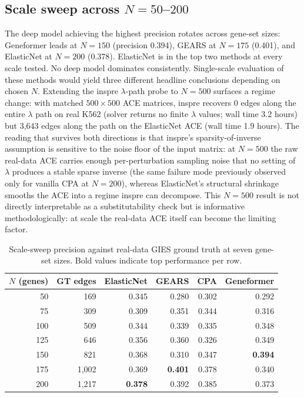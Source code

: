 \documentclass{article}
\theoremstyle{plain}
\theoremstyle{definition}
\theoremstyle{remark}
\begin{document}
\subsection{Scale sweep across $N{=}50$--$200$}
\label{app:scale-sweep}
The deep model achieving the highest precision rotates across gene-set sizes: Geneformer leads at $N{=}150$ (precision 0.394), GEARS at $N{=}175$ (0.401), and ElasticNet at $N{=}200$ (0.378). ElasticNet is in the top two methods at every scale tested. No deep model dominates consistently. Single-scale evaluation of these methods would yield three different headline conclusions depending on chosen $N$. Extending the inspre $\lambda$-path probe to $N{=}500$ surfaces a regime change: with matched $500 \times 500$ ACE matrices, inspre recovers 0 edges along the entire $\lambda$ path on real K562 (solver returns no finite $\lambda$ values; wall time 3.2 hours) but 3{,}643 edges along the path on the ElasticNet ACE (wall time 1.9 hours). The reading that survives both directions is that inspre's sparsity-of-inverse assumption is sensitive to the noise floor of the input matrix: at $N{=}500$ the raw real-data ACE carries enough per-perturbation sampling noise that no setting of $\lambda$ produces a stable sparse inverse (the same failure mode previously observed only for vanilla CPA at $N{=}200$), whereas ElasticNet's structural shrinkage smooths the ACE into a regime inspre can decompose. This $N{=}500$ result is not directly interpretable as a substitutability check but is informative methodologically: at scale the real-data ACE itself can become the limiting factor.

\begin{table}[h]
\centering
\small
\begin{tabular}{rrrrrr}
\toprule
\textbf{$N$ (genes)} & \textbf{GT edges} & \textbf{ElasticNet} & \textbf{GEARS} & \textbf{CPA} & \textbf{Geneformer} \\
\midrule
50  & 169   & 0.345 & 0.280 & 0.302 & 0.292 \\
75  & 309   & 0.309 & 0.351 & 0.344 & 0.316 \\
100 & 509   & 0.344 & 0.339 & 0.335 & 0.348 \\
125 & 646   & 0.356 & 0.360 & 0.326 & 0.349 \\
150 & 821   & 0.368 & 0.310 & 0.347 & \textbf{0.394} \\
175 & 1{,}002 & 0.369 & \textbf{0.401} & 0.378 & 0.340 \\
200 & 1{,}217 & \textbf{0.378} & 0.392 & 0.385 & 0.373 \\
\bottomrule
\end{tabular}
\caption{Scale-sweep precision against real-data GIES ground truth at seven gene-set sizes. Bold values indicate top performance per row.}
\end{table}
\end{document}
